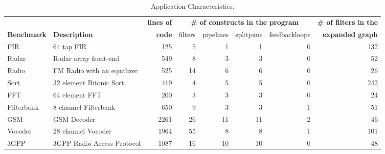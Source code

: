 
\begin{table*}[t]
\begin{center}
\scriptsize
\begin{tabular}{|l|l||r||r|r|r|r||r||} \hline
 & & {\bf lines of} & \multicolumn{4}{|c||}{\bf \# of constructs in the program} & {\bf \# of filters in the} \\ \cline{4-7}
{\bf Benchmark} & {\bf Description} & {\bf code} & filters & pipelines & splitjoins & feedbackloops & {\bf expanded graph}
\\
\hline \hline
FIR & 64 tap FIR & 
125 & 5 & 1 & 1 & 0 & 132
\\ \hline
Radar & Radar array front-end\cite{pca} & 
549 & 8 & 3 & 3 & 0 & 52
\\ \hline
Radio & FM Radio with an equalizer & 
525 & 14 & 6 & 6 & 0 & 26
\\ \hline
Sort & 32 element Bitonic Sort & 
419 & 4 & 5 & 5 & 0 & 242
\\  \hline
FFT & 64 element FFT & 
200 & 3 & 3 & 3 & 0 & 24
\\  \hline
Filterbank & 8 channel Filterbank & 
650 & 9 & 3 & 3 & 1 & 51
\\  \hline
GSM & GSM Decoder & 
2261 & 26 & 11 & 11 & 2 & 46
\\ \hline
Vocoder & 28 channel Vocoder &  
1964 & 55 & 8 & 8 & 1 & 101
\\ \hline
3GPP & 3GPP Radio Access Protocol &  
1087 & 16 & 10 & 10 & 0 & 48
\\ \hline
\hline
\end{tabular}
\vspace{-6pt}
\caption{\protect\small Application Characteristics.}
\label{tab:benchmarks}
\end{center}
\end{table*}

